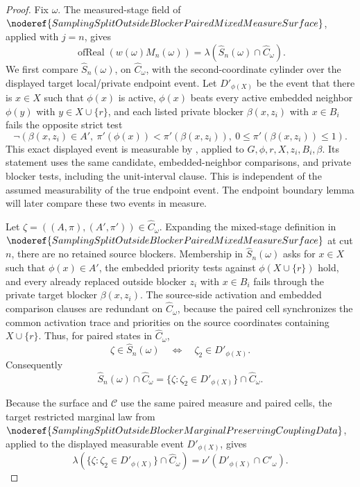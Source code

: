 \begin{proof}
Fix \(\omega\).  The measured-stage field of
\(\noderef{SamplingSplitOutsideBlockerPairedMixedMeasureSurface}\), applied
with \(j=n\), gives
\[
  \operatorname{ofReal}(w(\omega)M_n(\omega))
  =
  \lambda(\widehat S_n(\omega)\cap\widehat C_\omega).
\]
We first compare \(\widehat S_n(\omega)\), on \(\widehat C_\omega\), with the
second-coordinate cylinder over the displayed target local/private endpoint
event.  Let \(D'_{\phi(X)}\) be the event that there is \(x\in X\) such that
\(\phi(x)\) is active, \(\phi(x)\) beats every active embedded neighbor
\(\phi(y)\) with \(y\in X\cup\{r\}\), and each listed private blocker
\(\beta(x,z_i)\) with \(x\in B_i\) fails the opposite strict test
\[
  \neg(\beta(x,z_i)\in A',\
       \pi'(\phi(x))<\pi'(\beta(x,z_i)),\
       0\le\pi'(\beta(x,z_i))\le1).
\]
This exact displayed event is measurable by
,
applied to \(G,\phi,r,X,z_i,B_i,\beta\). Its statement uses the same
candidate, embedded-neighbor comparisons, and private blocker tests,
including the unit-interval clause. This is independent of the assumed
measurability of the true endpoint event. The endpoint boundary lemma will
later compare these two events in measure.

Let \(\zeta=((A,\pi),(A',\pi'))\in\widehat C_\omega\).  Expanding the
mixed-stage definition in
\(\noderef{SamplingSplitOutsideBlockerPairedMixedMeasureSurface}\) at cut
\(n\), there are no retained source blockers.  Membership in
\(\widehat S_n(\omega)\) asks for \(x\in X\) such that \(\phi(x)\in A'\), the
embedded priority tests against \(\phi(X\cup\{r\})\) hold, and every already
replaced outside blocker \(z_i\) with \(x\in B_i\) fails through the private
target blocker \(\beta(x,z_i)\).  The source-side activation and embedded
comparison clauses are redundant on \(\widehat C_\omega\), because the paired
cell synchronizes the common activation trace and priorities on the source
coordinates containing \(X\cup\{r\}\).  Thus, for paired states in
\(\widehat C_\omega\),
\[
  \zeta\in\widehat S_n(\omega)
  \quad\Longleftrightarrow\quad
  \zeta_2\in D'_{\phi(X)} .
\]
Consequently
\[
  \widehat S_n(\omega)\cap\widehat C_\omega
  =
  \{\zeta:\zeta_2\in D'_{\phi(X)}\}\cap\widehat C_\omega .
\]

Because the surface and \(\mathcal C\) use the same paired measure and paired
cells, the target restricted marginal law from
\(\noderef{SamplingSplitOutsideBlockerMarginalPreservingCouplingData}\),
applied to the displayed measurable event \(D'_{\phi(X)}\), gives
\[
  \lambda(\{\zeta:\zeta_2\in D'_{\phi(X)}\}\cap\widehat C_\omega)
  =
  \nu'(D'_{\phi(X)}\cap C'_\omega).
\]


\end{proof}
